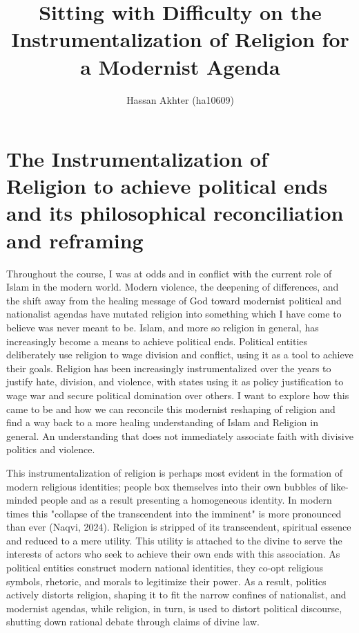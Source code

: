 \documentclass[12pt]{article}
\title{Sitting with Difficulty on the Instrumentalization of Religion for a Modernist Agenda}
\author{Hassan Akhter (ha10609)}
\date{}
\begin{document}
\maketitle

\section*{The Instrumentalization of Religion to achieve political ends and its philosophical reconciliation and reframing}
Throughout the course, I was at odds and in conflict with the current role of Islam in the modern world. Modern violence, the deepening of differences, and the shift away from the healing message of God toward modernist political and nationalist agendas have mutated religion into something which I have come to believe was never meant to be. Islam, and more so religion in general, has increasingly become a means to achieve political ends. Political entities deliberately use religion to wage division and conflict, using it as a tool to achieve their goals. Religion has been increasingly instrumentalized over the years to justify hate, division, and violence, with states using it as policy justification to wage war and secure political domination over others. I want to explore how this came to be and how we can reconcile this modernist reshaping of religion and find a way back to a more healing understanding of Islam and Religion in general. An understanding that does not immediately associate faith with divisive politics and violence.

This instrumentalization of religion is perhaps most evident in the formation of modern religious identities; people box themselves into their own bubbles of like-minded people and as a result presenting a homogeneous identity. In modern times this "collapse of the transcendent into the imminent" is more pronounced than ever (Naqvi, 2024). Religion is stripped of its transcendent, spiritual essence and reduced to a mere utility. This utility is attached to the divine to serve the interests of actors who seek to achieve their own ends with this association. As political entities construct modern national identities, they co-opt religious symbols, rhetoric, and morals to legitimize their power. As a result, politics actively distorts religion, shaping it to fit the narrow confines of nationalist, and modernist agendas, while religion, in turn, is used to distort political discourse, shutting down rational debate through claims of divine law.

\vspace{2em}
\end{document}
